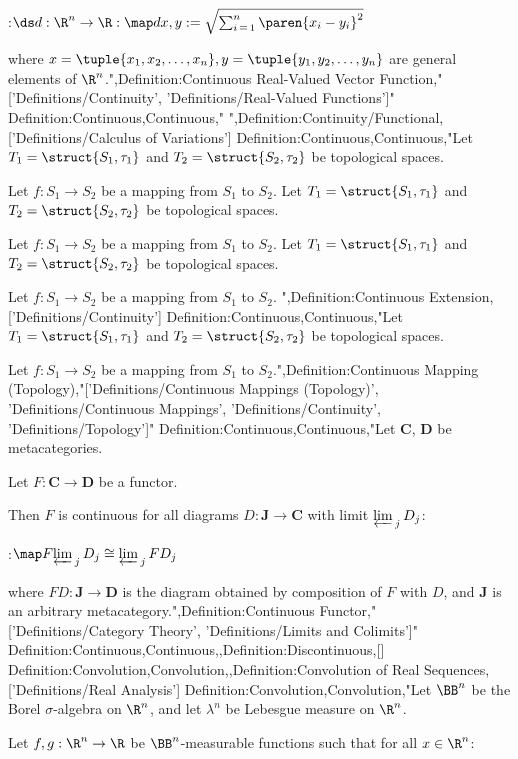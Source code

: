 :$\ds d: \R^n \to \R: \map d {x, y} := \sqrt {\sum_{i \mathop = 1}^n \paren {x_i - y_i}^2}$

where $x = \tuple {x_1, x_2, \ldots, x_n}, y = \tuple {y_1, y_2, \ldots, y_n}$ are general elements of $\R^n$.",Definition:Continuous Real-Valued Vector Function,"['Definitions/Continuity', 'Definitions/Real-Valued Functions']"
Definition:Continuous,Continuous,"
",Definition:Continuity/Functional,['Definitions/Calculus of Variations']
Definition:Continuous,Continuous,"Let $T_1 = \struct {S_1, \tau_1}$ and $T_2 = \struct {S_2, \tau_2}$ be topological spaces.

Let $f: S_1 \to S_2$ be a mapping from $S_1$ to $S_2$.
Let $T_1 = \struct {S_1, \tau_1}$ and $T_2 = \struct {S_2, \tau_2}$ be topological spaces.

Let $f: S_1 \to S_2$ be a mapping from $S_1$ to $S_2$.
Let $T_1 = \struct {S_1, \tau_1}$ and $T_2 = \struct {S_2, \tau_2}$ be topological spaces.

Let $f: S_1 \to S_2$ be a mapping from $S_1$ to $S_2$.
",Definition:Continuous Extension,['Definitions/Continuity']
Definition:Continuous,Continuous,"Let $T_1 = \struct {S_1, \tau_1}$ and $T_2 = \struct {S_2, \tau_2}$ be topological spaces.

Let $f: S_1 \to S_2$ be a mapping from $S_1$ to $S_2$.",Definition:Continuous Mapping (Topology),"['Definitions/Continuous Mappings (Topology)', 'Definitions/Continuous Mappings', 'Definitions/Continuity', 'Definitions/Topology']"
Definition:Continuous,Continuous,"Let $\mathbf C$, $\mathbf D$ be metacategories.

Let $F: \mathbf C \to \mathbf D$ be a functor.


Then $F$ is continuous  for all diagrams $D: \mathbf J \to \mathbf C$ with limit ${\varprojlim \,}_j \, D_j$:

:$\map F {{\varprojlim \,}_j \, D_j} \cong {\varprojlim \,}_j \, F D_j$

where $F D: \mathbf J \to \mathbf D$ is the diagram obtained by composition of $F$ with $D$, and $\mathbf J$ is an arbitrary metacategory.",Definition:Continuous Functor,"['Definitions/Category Theory', 'Definitions/Limits and Colimits']"
Definition:Continuous,Continuous,,Definition:Discontinuous,[]
Definition:Convolution,Convolution,,Definition:Convolution of Real Sequences,['Definitions/Real Analysis']
Definition:Convolution,Convolution,"Let $\BB^n$ be the Borel $\sigma$-algebra on $\R^n$, and let $\lambda^n$ be Lebesgue measure on $\R^n$.

Let $f, g: \R^n \to \R$ be $\BB^n$-measurable functions such that for all $x \in \R^n$:

